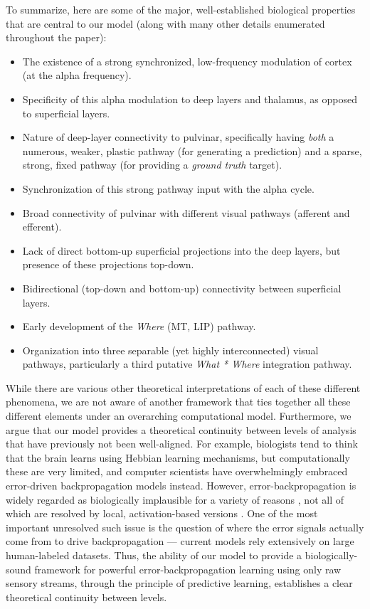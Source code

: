 \documentclass[11pt,twoside]{article}
\newif\myifpdf
\begin{document}
To summarize, here are some of the major, well-established biological properties that are central to our model (along with many other details enumerated throughout the paper):
\begin{itemize}
\item The existence of a strong synchronized, low-frequency modulation of cortex (at the alpha frequency).
\item Specificity of this alpha modulation to deep layers and thalamus, as opposed to superficial layers.
\item Nature of deep-layer connectivity to pulvinar, specifically having {\em both} a numerous, weaker, plastic pathway (for generating a prediction) and a sparse, strong, fixed pathway (for providing a {\em ground truth} target).
\item Synchronization of this strong pathway input with the alpha cycle.
\item Broad connectivity of pulvinar with different visual pathways (afferent and efferent).
\item Lack of direct bottom-up superficial projections into the deep layers, but presence of these projections top-down.
\item Bidirectional (top-down and bottom-up) connectivity between superficial layers.
\item Early development of the {\em Where} (MT, LIP) pathway.
\item Organization into three separable (yet highly interconnected) visual pathways, particularly a third putative {\em What * Where} integration pathway.
\end{itemize}

While there are various other theoretical interpretations of each of these different phenomena, we are not aware of another framework that ties together all these different elements under an overarching computational model.  Furthermore, we argue that our model provides a theoretical continuity between levels of analysis that have previously not been well-aligned.  For example, biologists tend to think that the brain learns using Hebbian learning mechanisms, but computationally these are very limited, and computer scientists have overwhelmingly embraced error-driven backpropagation models instead.  However, error-backpropagation is widely regarded as biologically implausible for a variety of reasons \cite[e.g.,]{Crick89}, not all of which are resolved by local, activation-based versions \cite{OReilly96,Movellan90,XieSeung03,ScellierBengio17}.  One of the most important unresolved such issue is the question of where the error signals actually come from to drive backpropagation --- current models rely extensively on large human-labeled datasets.  Thus, the ability of our model to provide a biologically-sound framework for powerful error-backpropagation learning using only raw sensory streams, through the principle of predictive learning, establishes a clear theoretical continuity between levels.
\end{document}
